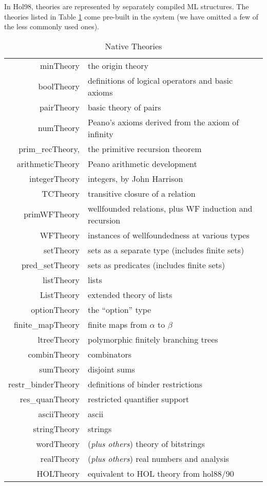 \documentclass[12pt,fleqn,a4paper]{report}
\begin{document}
In Hol98, theories are represented by separately compiled ML
structures. The theories listed in Table \ref{nativeTheories} come
pre-built in the system (we have omitted a few of the less commonly used
ones).
\begin{table}
\begin{center}
\begin{tabular}{|r|l|} \hline
minTheory & the origin theory \\
boolTheory & definitions of logical operators and basic axioms \\
pairTheory & basic theory of pairs \\
numTheory & Peano's axioms derived from the axiom of infinity \\
prim\_recTheory, & the primitive recursion theorem \\
arithmeticTheory & Peano arithmetic development \\
integerTheory & integers, by John Harrison \\
TCTheory & transitive closure of a relation \\
primWFTheory & wellfounded relations, plus WF induction and recursion \\
WFTheory & instances of wellfoundedness at various types \\
setTheory & sets as a separate type (includes finite sets) \\
pred\_setTheory & sets as predicates (includes finite sets) \\
listTheory & lists  \\
ListTheory & extended theory of lists \\
optionTheory & the ``option'' type \\
finite\_mapTheory & finite maps from $\alpha$ to $\beta$ \\
ltreeTheory & polymorphic finitely branching trees \\
combinTheory & combinators \\
sumTheory & disjoint sums \\
restr\_binderTheory & definitions of binder restrictions \\
res\_quanTheory & restricted quantifier support \\
asciiTheory & ascii \\
stringTheory & strings \\
wordTheory & ({\it plus others}) theory of bitstrings \\
realTheory & ({\it plus others}) real numbers and analysis \\
HOLTheory & equivalent to HOL theory from hol88/90\\  \hline
\end{tabular}
\caption{Native Theories}\label{nativeTheories}
\end{center}
\end{table}
\end{document}

